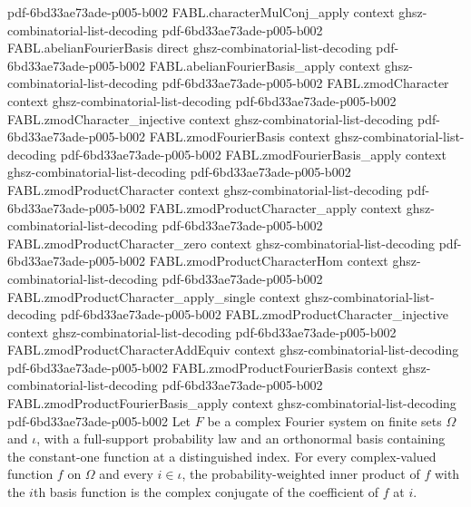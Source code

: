 \begin{theorem}
  {pdf-6bd33ae73ade-p005-b002}
\proofstep
  {FABL.characterMulConj_apply}
  {context}
  {ghsz-combinatorial-list-decoding}
  {pdf-6bd33ae73ade-p005-b002}
\proofstep
  {FABL.abelianFourierBasis}
  {direct}
  {ghsz-combinatorial-list-decoding}
  {pdf-6bd33ae73ade-p005-b002}
\proofstep
  {FABL.abelianFourierBasis_apply}
  {context}
  {ghsz-combinatorial-list-decoding}
  {pdf-6bd33ae73ade-p005-b002}
\proofstep
  {FABL.zmodCharacter}
  {context}
  {ghsz-combinatorial-list-decoding}
  {pdf-6bd33ae73ade-p005-b002}
\proofstep
  {FABL.zmodCharacter_injective}
  {context}
  {ghsz-combinatorial-list-decoding}
  {pdf-6bd33ae73ade-p005-b002}
\proofstep
  {FABL.zmodFourierBasis}
  {context}
  {ghsz-combinatorial-list-decoding}
  {pdf-6bd33ae73ade-p005-b002}
\proofstep
  {FABL.zmodFourierBasis_apply}
  {context}
  {ghsz-combinatorial-list-decoding}
  {pdf-6bd33ae73ade-p005-b002}
\proofstep
  {FABL.zmodProductCharacter}
  {context}
  {ghsz-combinatorial-list-decoding}
  {pdf-6bd33ae73ade-p005-b002}
\proofstep
  {FABL.zmodProductCharacter_apply}
  {context}
  {ghsz-combinatorial-list-decoding}
  {pdf-6bd33ae73ade-p005-b002}
\proofstep
  {FABL.zmodProductCharacter_zero}
  {context}
  {ghsz-combinatorial-list-decoding}
  {pdf-6bd33ae73ade-p005-b002}
\proofstep
  {FABL.zmodProductCharacterHom}
  {context}
  {ghsz-combinatorial-list-decoding}
  {pdf-6bd33ae73ade-p005-b002}
\proofstep
  {FABL.zmodProductCharacter_apply_single}
  {context}
  {ghsz-combinatorial-list-decoding}
  {pdf-6bd33ae73ade-p005-b002}
\proofstep
  {FABL.zmodProductCharacter_injective}
  {context}
  {ghsz-combinatorial-list-decoding}
  {pdf-6bd33ae73ade-p005-b002}
\proofstep
  {FABL.zmodProductCharacterAddEquiv}
  {context}
  {ghsz-combinatorial-list-decoding}
  {pdf-6bd33ae73ade-p005-b002}
\proofstep
  {FABL.zmodProductFourierBasis}
  {context}
  {ghsz-combinatorial-list-decoding}
  {pdf-6bd33ae73ade-p005-b002}
\proofstep
  {FABL.zmodProductFourierBasis_apply}
  {context}
  {ghsz-combinatorial-list-decoding}
  {pdf-6bd33ae73ade-p005-b002}
Let $F$ be a complex Fourier system on finite sets $Ω$ and $ι$, with a full-support
probability law and an orthonormal basis containing the constant-one function at a
distinguished index. For every complex-valued function $f$ on $Ω$ and every $i\in ι$,
the probability-weighted inner product of $f$ with the $i$th basis function is the
complex conjugate of the coefficient of $f$ at $i$.
\end{theorem}

